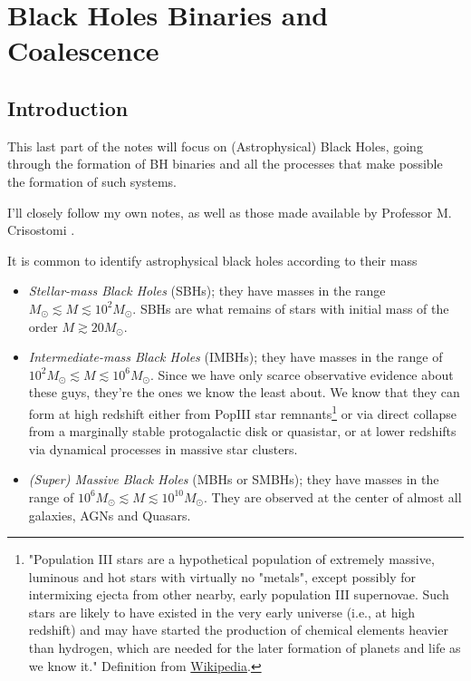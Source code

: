 \chapter{Black Holes Binaries and Coalescence}
\section{Introduction}
This last part of the notes will focus on (Astrophysical) Black Holes, going through the formation of BH binaries and all the processes that make possible the formation of such systems.
\par I'll closely follow my own notes, as well as those made available by Professor M. Crisostomi \cite{celoria2018lecturenotesblackhole}.
\vspace{0.5cm}
\par It is common to identify astrophysical black holes according to their mass
\begin{itemize}
    \item \emph{Stellar-mass Black Holes} (SBHs); they have masses in the range $M_{\odot}\lesssim M \lesssim 10^{2} M_{\odot}$. SBHs are what remains of stars with initial mass of the order $M\gtrsim 20M_{\odot}$.
    \item \emph{Intermediate-mass Black Holes} (IMBHs); they have masses in the range of $10^{2}M_{\odot}\lesssim M \lesssim 10^{6}M_{\odot}$. Since we have only scarce observative evidence about these guys, they're the ones we know the least about. We know that they can form at high redshift either from PopIII star remnants\footnote{"Population III stars are a hypothetical population of extremely massive, luminous and hot stars with virtually no "metals", except possibly for intermixing ejecta from other nearby, early population III supernovae. Such stars are likely to have existed in the very early universe (i.e., at high redshift) and may have started the production of chemical elements heavier than hydrogen, which are needed for the later formation of planets and life as we know it." Definition from \href{https://en.wikipedia.org/wiki/Stellar_population}{Wikipedia}.} or via direct collapse from a marginally stable protogalactic disk or quasistar, or at lower redshifts via dynamical processes in massive star clusters.
    \item \emph{(Super) Massive Black Holes} (MBHs or SMBHs); they have masses in the range of $10^{6}M_{\odot}\lesssim M \lesssim 10^{10}M_{\odot}$. They are observed at the center of almost all galaxies, AGNs and Quasars.
\end{itemize}
